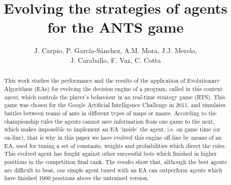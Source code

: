 \documentclass[runningheads]{llncs}
\begin{document}
\mainmatter  %



\title{Evolving the strategies of agents for the ANTS game} 




%
\author{J. Carpio, P. Garc\'ia-S\'anchez, A.M. Mora, J.J. Merelo,\\ 
J. Caraballo, F. Vaz, C. Cotta}
%
%
%
%



\maketitle

\begin{abstract}
This work studies the performance and the results of the application of Evolutionary Algorithms (EAs) for evolving the decision engine of a program, called in this context \textit{agent}, which controls the player's behaviour in an real-time strategy game (RTS). This game was chosen for the Google Artificial Intelligence Challenge in 2011, and simulates battles between teams of ants in different types of maps or mazes.
According to the championship rules the agents cannot save information
from one game to the next, which makes impossible to implement an EA
`inside' the agent, i.e. on game time (or on-line), that is why in
this paper we have evolved this engine off-line by means of an EA, %
used for tuning a set of constants, weights and probabilities which direct
the rules. This evolved  agent has fought against other successful bots
which finished in higher positions in the competition final rank. 
The results show that, although the best agents are difficult to beat,
our simple agent tuned with an EA can outperform agents which
have finished 1000 positions above the untrained version. 
\end{abstract}
\end{document}
